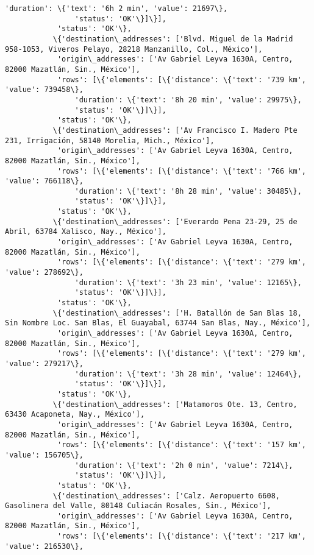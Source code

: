\documentclass[11pt]{article}
\begin{document}
\begin{Verbatim}[commandchars=\\\{\}]
                'duration': \{'text': '6h 2 min', 'value': 21697\},
                'status': 'OK'\}]\}],
            'status': 'OK'\},
           \{'destination\_addresses': ['Blvd. Miguel de la Madrid 958-1053, Viveros Pelayo, 28218 Manzanillo, Col., México'],
            'origin\_addresses': ['Av Gabriel Leyva 1630A, Centro, 82000 Mazatlán, Sin., México'],
            'rows': [\{'elements': [\{'distance': \{'text': '739 km', 'value': 739458\},
                'duration': \{'text': '8h 20 min', 'value': 29975\},
                'status': 'OK'\}]\}],
            'status': 'OK'\},
           \{'destination\_addresses': ['Av Francisco I. Madero Pte 231, Irrigación, 58140 Morelia, Mich., México'],
            'origin\_addresses': ['Av Gabriel Leyva 1630A, Centro, 82000 Mazatlán, Sin., México'],
            'rows': [\{'elements': [\{'distance': \{'text': '766 km', 'value': 766118\},
                'duration': \{'text': '8h 28 min', 'value': 30485\},
                'status': 'OK'\}]\}],
            'status': 'OK'\},
           \{'destination\_addresses': ['Everardo Pena 23-29, 25 de Abril, 63784 Xalisco, Nay., México'],
            'origin\_addresses': ['Av Gabriel Leyva 1630A, Centro, 82000 Mazatlán, Sin., México'],
            'rows': [\{'elements': [\{'distance': \{'text': '279 km', 'value': 278692\},
                'duration': \{'text': '3h 23 min', 'value': 12165\},
                'status': 'OK'\}]\}],
            'status': 'OK'\},
           \{'destination\_addresses': ['H. Batallón de San Blas 18, Sin Nombre Loc. San Blas, El Guayabal, 63744 San Blas, Nay., México'],
            'origin\_addresses': ['Av Gabriel Leyva 1630A, Centro, 82000 Mazatlán, Sin., México'],
            'rows': [\{'elements': [\{'distance': \{'text': '279 km', 'value': 279217\},
                'duration': \{'text': '3h 28 min', 'value': 12464\},
                'status': 'OK'\}]\}],
            'status': 'OK'\},
           \{'destination\_addresses': ['Matamoros Ote. 13, Centro, 63430 Acaponeta, Nay., México'],
            'origin\_addresses': ['Av Gabriel Leyva 1630A, Centro, 82000 Mazatlán, Sin., México'],
            'rows': [\{'elements': [\{'distance': \{'text': '157 km', 'value': 156705\},
                'duration': \{'text': '2h 0 min', 'value': 7214\},
                'status': 'OK'\}]\}],
            'status': 'OK'\},
           \{'destination\_addresses': ['Calz. Aeropuerto 6608, Gasolinera del Valle, 80148 Culiacán Rosales, Sin., México'],
            'origin\_addresses': ['Av Gabriel Leyva 1630A, Centro, 82000 Mazatlán, Sin., México'],
            'rows': [\{'elements': [\{'distance': \{'text': '217 km', 'value': 216530\},

\end{Verbatim}
\end{document}
